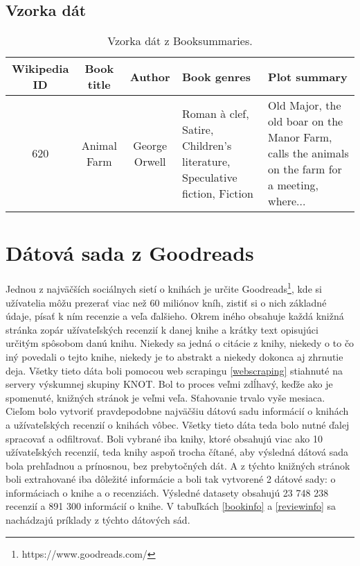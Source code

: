 \subsection*{Vzorka dát}

\begin{table}[hbt]
\centering
\caption{Vzorka dát z Booksummaries.}
\label{booksummaries}
\begin{tabular}{|c|c|c|
>{\centering\arraybackslash}m{7em}|
>{\centering\arraybackslash}m{7em}|}
\hline
Wikipedia ID & Book title & Author & Book genres & Plot summary \\
\hline
620 & Animal Farm & George Orwell & Roman à clef, Satire, Children's literature, Speculative fiction, Fiction &  Old Major, the old boar on the Manor Farm, calls the animals on the farm for a meeting, where...\\ 
\hline

\end{tabular}
\end{table}

\section{Dátová sada z Goodreads} \label{goodreadsdata}

Jednou z najväčších sociálnych sietí o knihách je určite Goodreads\footnote{https://www.goodreads.com/}, kde si užívatelia môžu prezerať viac než 60 miliónov kníh, zistiť si o nich základné údaje, písať k ním recenzie a veľa ďalšieho. Okrem iného obsahuje každá knižná stránka zopár užívateľských recenzií k danej knihe a krátky text opisujúci určitým spôsobom danú knihu. Niekedy sa jedná o citácie z knihy, niekedy o to čo iný povedali o tejto knihe, niekedy je to abstrakt a niekedy dokonca aj zhrnutie deja. Všetky tieto dáta boli pomocou web scrapingu \ref{webscraping} stiahnuté na servery výskumnej skupiny KNOT. Bol to proces veľmi zdĺhavý, keďže ako je spomenuté, knižných stránok je veľmi veľa. Sťahovanie trvalo vyše mesiaca. Cieľom bolo vytvoriť pravdepodobne najväčšiu dátovú sadu informácií o knihách a užívateľských recenzií o knihách vôbec. Všetky tieto dáta teda bolo nutné ďalej spracovať a odfiltrovať. Boli vybrané iba knihy, ktoré obsahujú viac ako 10 užívateľských recenzií, teda knihy aspoň trocha čítané, aby výsledná dátová sada bola prehľadnou a prínosnou, bez prebytočných dát. A z týchto knižných stránok boli extrahované iba dôležité informácie a boli tak vytvorené 2 dátové sady: o informáciach o knihe a o recenziách. Výsledné datasety obsahujú 23 748 238 recenzií a 891 300 informácií o knihe. V tabuľkách 
\ref{bookinfo} a \ref{reviewinfo} sa nachádzajú príklady z týchto dátových sád.

